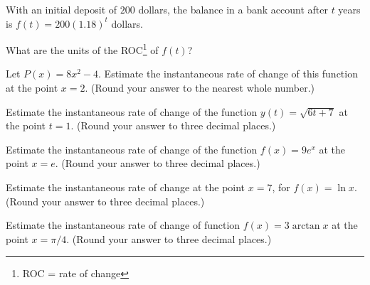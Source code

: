 \documentclass[12pt,addpoints, answers, fleqn]{exam}
\begin{document}
\begin{teacher}
\begin{questions}
\question 	%

With an initial deposit of $200$ dollars, the balance in a bank account after $t$ years is $f\left(t\right) = 200\left(1.18\right)^t$ dollars.

What are the units of the ROC\footnote{ROC = rate of change} of $f\left(t\right)$?

\begin{solution}
\end{solution}

\question 	%

Let $P\left(x\right) = 8x^2 - 4$. Estimate the instantaneous rate of change of this function at the point $x = 2$. (Round your answer to the nearest whole number.)
 
\begin{solution}
\end{solution}

\question 	%

Estimate the instantaneous rate of change of the function $y\left(t\right) = \sqrt{6t + 7}$ at the point $t = 1$. (Round your answer to three decimal places.)
\begin{solution}
\end{solution}

\question 	%

Estimate the instantaneous rate of change of the function $f\left(x\right) = 9e^x$ at the point $x = e$.
 (Round your answer to three decimal places.)
\begin{solution}
\end{solution}

\question 	%

Estimate the instantaneous rate of change at the point $x = 7$, for $f\left(x\right) = \ln x$. (Round your answer to three decimal places.)
\begin{solution}
\end{solution}

\question 	%

Estimate the instantaneous rate of change of function $f\left(x\right) = 3 \arctan x$ at the point $x = \pi/4$.
 (Round your answer to three decimal places.)

\begin{solution}
\end{solution}


\end{questions}
\end{teacher}
\end{document}
